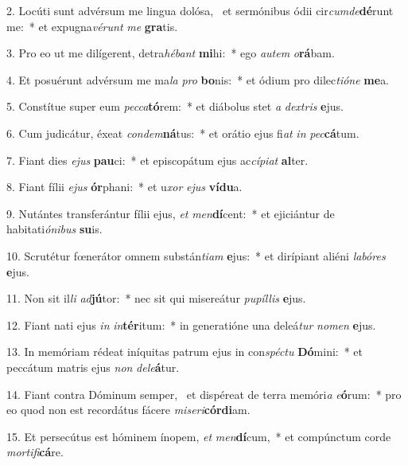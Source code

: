 2. Locúti sunt advérsum me lingua dolósa, \dag\  et sermónibus ódii cir\textit{cum}\textit{de}\textbf{dé}runt me:~*  et expugna\textit{vé}\textit{runt} \textit{me} \textbf{gra}tis.\

3. Pro eo ut me dilígerent, detra\textit{hé}\textit{bant} \textbf{mi}hi:~*  ego \textit{au}\textit{tem} \textit{o}\textbf{rá}bam.\

4. Et posuérunt advérsum me ma\textit{la} \textit{pro} \textbf{bo}nis:~*  et ódium pro dilec\textit{ti}\textit{ó}\textit{ne} \textbf{me}a.\

5. Constítue super eum \textit{pec}\textit{ca}\textbf{tó}rem:~*  et diábolus stet \textit{a} \textit{dex}\textit{tris} \textbf{e}jus.\

6. Cum judicátur, éxeat \textit{con}\textit{dem}\textbf{ná}tus:~*  et orátio ejus fi\textit{at} \textit{in} \textit{pec}\textbf{cá}tum.\

7. Fiant dies \textit{e}\textit{jus} \textbf{pau}ci:~*  et episcopátum ejus ac\textit{cí}\textit{pi}\textit{at} \textbf{al}ter.\

8. Fiant fílii \textit{e}\textit{jus} \textbf{ór}phani:~*  et u\textit{xor} \textit{e}\textit{jus} \textbf{ví}\textbf{du}a.\

9. Nutántes transferántur fílii ejus, \textit{et} \textit{men}\textbf{dí}cent:~*  et ejiciántur de habitati\textit{ó}\textit{ni}\textit{bus} \textbf{su}is.\

10. Scrutétur fœnerátor omnem substán\textit{ti}\textit{am} \textbf{e}jus:~*  et dirípiant aliéni \textit{la}\textit{bó}\textit{res} \textbf{e}jus.\

11. Non sit il\textit{li} \textit{ad}\textbf{jú}tor:~*  nec sit qui misereátur \textit{pu}\textit{píl}\textit{lis} \textbf{e}jus.\

12. Fiant nati ejus \textit{in} \textit{in}\textbf{tér}itum:~*  in generatióne una deleá\textit{tur} \textit{no}\textit{men} \textbf{e}jus.\

13. In memóriam rédeat iníquitas patrum ejus in con\textit{spéc}\textit{tu} \textbf{Dó}mini:~*  et peccátum matris ejus \textit{non} \textit{de}\textit{le}\textbf{á}tur.\

14. Fiant contra Dóminum semper, \dag\  et dispéreat de terra memóri\textit{a} \textit{e}\textbf{ó}rum:~*  pro eo quod non est recordátus fácere \textit{mi}\textit{se}\textit{ri}\textbf{cór}\textbf{di}am.\

15. Et persecútus est hóminem ínopem, \textit{et} \textit{men}\textbf{dí}cum,~*  et compúnctum corde \textit{mor}\textit{ti}\textit{fi}\textbf{cá}re.\

